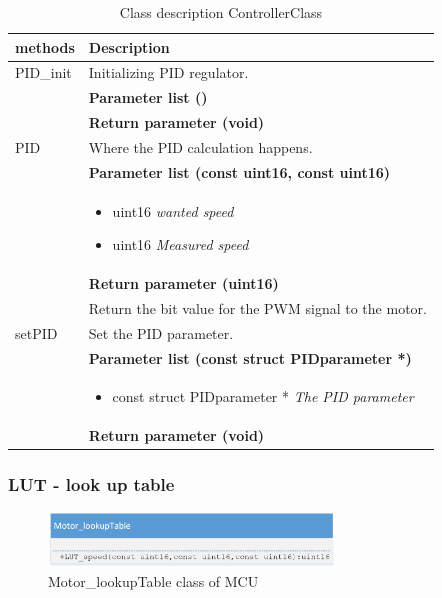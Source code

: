 \begin{table}[H]
	\centering
	\begin{tabular}{|p{5 cm}|p{10 cm}|}
		\hline
		\textbf{methods} & \textbf{Description} \\ \hline
		
		PID\_init
		& Initializing PID regulator.
		\\ & \textbf{Parameter list ()}
		\\ & \textbf{Return parameter (void)}
		\\ \hline
		
		PID
		& Where the PID calculation happens.
		\\ & \textbf{Parameter list (const uint16, const uint16)}
		\\ & \begin{itemize}
			\item {\large uint16}
			\subitem \textit{wanted speed}
			\item {\large uint16}
			\subitem \textit{Measured speed}
		\end{itemize}
		\\ & \textbf{Return parameter (uint16)}
		\\ & Return the bit value for the PWM signal to the motor.
		\\ \hline
		
		setPID
		& Set the PID parameter.
		\\ & \textbf{Parameter list (const struct PIDparameter *)}
		\\ & \begin{itemize}
			\item {\large const struct PIDparameter *}
			\subitem \textit{The PID parameter}
		\end{itemize}
		\\ & \textbf{Return parameter (void)}
		\\ \hline
		
	\end{tabular}
	\caption{Class description ControllerClass}
	\label{table:Class_description_MCU_PID}
\end{table}

\subsubsection{LUT - look up table}

\begin{figure}[H]
	\centering
	\includegraphics [width=3in]{Software/Pictures/class-diagram-LUT.png}
	\caption{Motor\_lookupTable class of MCU}
	\label{fig:Class_diagram_MCU_LUT}
\end{figure}


